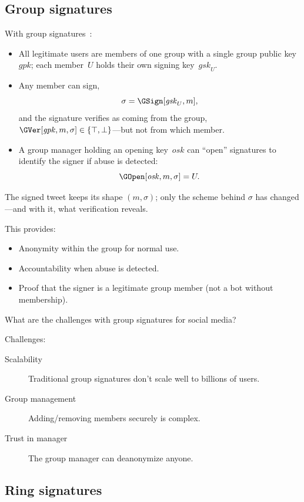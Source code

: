 \subsection{Group signatures}

With group signatures~\autocite{ChaumvanHeyst1991}:
\begin{itemize}
  \item All legitimate users are members of one group with a single group
    public key~\(\mathit{gpk}\); each member~\(U\) holds their own
    signing key~\(\mathit{gsk}_U\).
  \item Any member can sign,
    \[
      \sigma = \GSign[\mathit{gsk}_U, m],
    \]
    and the signature verifies as coming from the group,
    \(\GVer[\mathit{gpk}, m, \sigma] \in \{\top, \bot\}\)---but not from
    which member.
  \item A group manager holding an opening key~\(\mathit{osk}\) can
    \enquote{open} signatures to identify the signer if abuse is
    detected:
    \[
      \GOpen[\mathit{osk}, m, \sigma] = U.
    \]
\end{itemize}

The signed tweet keeps its shape \((m, \sigma)\); only the scheme behind
\(\sigma\) has changed---and with it, what verification reveals.

This provides:
\begin{itemize}
  \item Anonymity within the group for normal use.
  \item Accountability when abuse is detected.
  \item Proof that the signer is a legitimate group member (not a bot
    without membership).
\end{itemize}

\begin{exercise}
  What are the challenges with group signatures for social media?
\end{exercise}

Challenges:
\begin{description}
  \item[Scalability] Traditional group signatures don't scale well to
    billions of users.
  \item[Group management] Adding/removing members securely is complex.
  \item[Trust in manager] The group manager can deanonymize anyone.
\end{description}

\subsection{Ring signatures}

